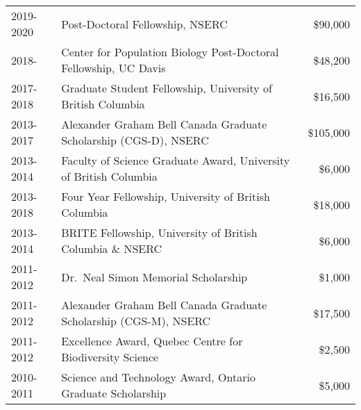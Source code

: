 \documentclass[12pt]{article}
\begin{document}
\begin{tabular}{llr}
  2019-2020 & Post-Doctoral Fellowship, NSERC & \$90,000 \\
  2018- & Center for Population Biology Post-Doctoral Fellowship, UC Davis & \$48,200 \\
  2017-2018 & Graduate Student Fellowship, University of British Columbia & \$16,500 \\
  2013-2017 & Alexander Graham Bell Canada Graduate Scholarship (CGS-D), NSERC & \$105,000\\
  2013-2014 & Faculty of Science Graduate Award, University of British Columbia & \$6,000\\
  2013-2018 & Four Year Fellowship, University of British Columbia & \$18,000\\
  2013-2014 & BRITE Fellowship, University of British Columbia \& NSERC & \$6,000\\
  2011-2012 & Dr.\ Neal Simon Memorial Scholarship & \$1,000\\
  2011-2012 & Alexander Graham Bell Canada Graduate Scholarship (CGS-M), NSERC & \$17,500\\
  2011-2012 & Excellence Award, Quebec Centre for Biodiversity Science & \$2,500\\
  2010-2011 & Science and Technology Award, Ontario Graduate Scholarship & \$5,000\\

\end{tabular}
\end{document}
